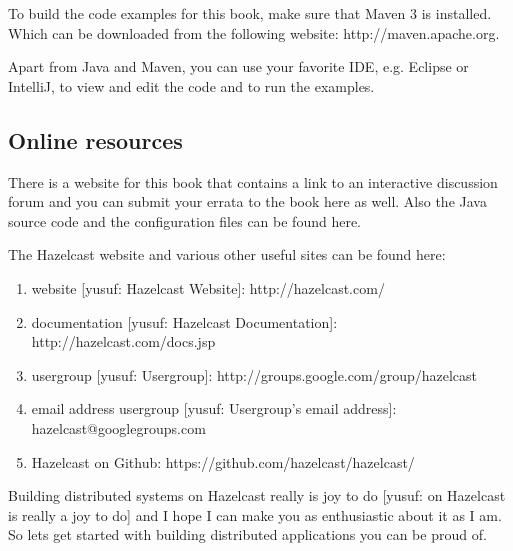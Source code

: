 To build the code examples for this book, make sure that Maven 3 is installed. Which can be downloaded from the following website: http://maven.apache.org.

Apart from Java and Maven, you can use your favorite IDE, e.g. Eclipse or IntelliJ, to view and edit the code and to run the examples. 

\subsection*{Online resources}
There is a website for this book that contains a link to an interactive discussion forum and you can submit your errata to the book here as well. Also the Java source code and the configuration files can be found here. 

The Hazelcast website and various other useful sites can be found here:
\begin{enumerate}
\item website [yusuf: Hazelcast Website]: http://hazelcast.com/
\item documentation [yusuf: Hazelcast Documentation]: http://hazelcast.com/docs.jsp
\item usergroup [yusuf: Usergroup]: http://groups.google.com/group/hazelcast
\item email address usergroup [yusuf: Usergroup's email address]: hazelcast@googlegroups.com
\item Hazelcast on Github: https://github.com/hazelcast/hazelcast/
\end{enumerate}
Building distributed systems on Hazelcast really is joy to do [yusuf: on Hazelcast is really a joy to do] and I hope I can make you as enthusiastic about it as I am. So lets get started with building distributed applications you can be proud of.
